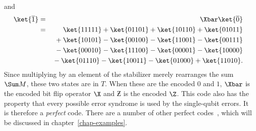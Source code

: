 and
\begin{eqnarray}
	\ket{\overline{1}} & = & \Xbar \ket{\overline{0}} \nonumber \\
	& = & \ket{11111} + \ket{01101} + \ket{10110} + \ket{01011} \nonumber \\
	& & \mbox{} + \ket{10101} - \ket{00100} - \ket{11001} - \ket{00111} \nonumber \\
	& & \mbox{} - \ket{00010} - \ket{11100} - \ket{00001} - \ket{10000} \\
	& & \mbox{} - \ket{01110} - \ket{10011} - \ket{01000} + \ket{11010}. \nonumber
\end{eqnarray}
Since multiplying by an element of the stabilizer merely rearranges the
sum $\Sum M$, these two states are in $T$.  When these are the encoded
$0$ and $1$, $\Xbar$ is the encoded bit flip operator $\X$ and $\Zbar$ is
the encoded $\Z$.  This code also has the property that every possible
error syndrome is used by the single-qubit errors.  It is therefore a {\em
perfect} code.  There are a number of other perfect
codes~\cite{gottesman-pasting,calderbank-GF4}, which will be discussed in
chapter~\ref{chap-examples}.

